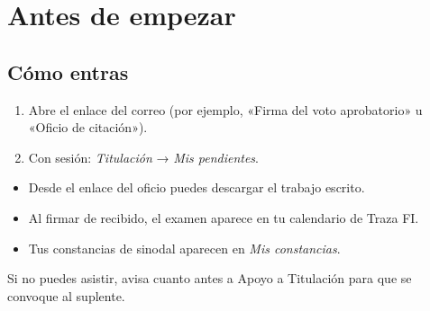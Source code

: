 \section{Antes de empezar}
\subsection*{Cómo entras}
\begin{enumerate}
  \item Abre el enlace del correo (por ejemplo, «Firma del voto aprobatorio» u «Oficio de citación»).
  \item Con sesión: \emph{Titulación} → \emph{Mis pendientes}.
\end{enumerate}
\begin{tencuenta}
\begin{itemize}
  \item Desde el enlace del oficio puedes descargar el trabajo escrito.
  \item Al firmar de recibido, el examen aparece en tu calendario de Traza FI.
  \item Tus constancias de sinodal aparecen en \emph{Mis constancias}.
\end{itemize}
\end{tencuenta}
\begin{algosalemal}
Si no puedes asistir, avisa cuanto antes a Apoyo a Titulación para que se convoque al suplente.
\end{algosalemal}
